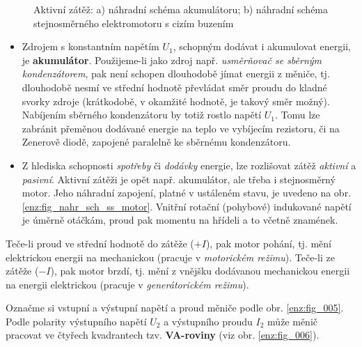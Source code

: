       \begin{figure}[ht!]
        \centering
        \hspace{1cm}
        \caption{Aktivní zátěž: a) náhradní schéma akumulátoru; b) náhradní schéma stejnosměrného 
          elektromotoru s cizím buzením}
        \label{enz:fig_aktivni_zatez}
      \end{figure}        
      \begin{itemize}\addtolength{\itemsep}{-0.5\baselineskip}
        \item Zdrojem s konstantním napětím $U_1$, schopným dodávat i akumulovat energii, je
              \textbf{akumulátor}. Použijeme-li jako zdroj např.\emph{ usměrňovač se sběrným 
              kondenzátorem}, pak není schopen dlouhodobě jímat energii z měniče, tj. dlouhodobě 
              nesmí ve střední hodnotě převládat směr proudu do kladné svorky zdroje (krátkodobě, 
              v okamžité hodnotě, je takový směr možný). Nabíjením sběrného kondenzátoru by totiž 
              rostlo napětí $U_1$. Tomu lze zabránit přeměnou dodávané energie na teplo ve 
              vybíjecím rezistoru, či na Zenerově diodě, zapojené paralelně ke sběrnému 
              kondenzátoru.
        \item Z hlediska schopnosti \emph{spotřeby} či \emph{dodávky} energie, lze rozlišovat 
              zátěž \emph{aktivní} a \emph{pasivní}. Aktivní zátěži je opět např. akumulátor, ale 
              třeba i stejnosměrný motor. Jeho náhradní zapojení, platné v ustáleném stavu, je 
              uvedeno na obr. \ref{enz:fig_nahr_sch_ss_motor}. Vnitřní rotační (pohybové) 
              indukované napětí je úměrně otáčkám, proud pak momentu na hřídeli a to včetně 
              znamének.
      \end{itemize}
      

      Teče-li proud ve  střední hodnotě do zátěže (\(+I\)), pak motor pohání, tj. mění elektrickou
      energii na mechanickou (pracuje v \emph{motorickém režimu}). Teče-li ze zátěže (\(-I\)), pak
      motor brzdí, tj. mění z vnějšku dodávanou mechanickou energii na energii elektrickou
      (pracuje v \emph{generátorickém režimu}).       
      
      Označme si vstupní a výstupní napětí a proud měniče podle obr. \ref{enz:fig_005}. Podle 
      polarity výstupního napětí $U_2$ a výstupního proudu $I_2$ může měnič pracovat ve čtyřech 
      kvadrantech tzv.\textbf{ VA-roviny} (viz obr. \ref{enz:fig_006}).

